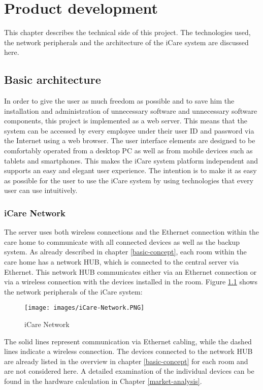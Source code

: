 \chapter{Product development}
This chapter describes the technical side of this project. The technologies used, the network peripherals and the architecture of the iCare system are discussed here.
\section{Basic architecture}
In order to give the user as much freedom as possible and to save him the installation and administration of unnecessary software and unnecessary software components, this project is implemented as a web server. This means that the system can be accessed by every employee under their user ID and password via the Internet using a web browser. The user interface elements are designed to be comfortably operated from a desktop PC as well as from mobile devices such as tablets and smartphones. This makes the iCare system platform independent and supports an easy and elegant user experience. The intention is to make it as easy as possible for the user to use the iCare system by using technologies that every user can use intuitively.

\subsection{iCare Network}
The server uses both wireless connections and the Ethernet connection within the care home to communicate with all connected devices as well as the backup system. As already described in chapter \ref{basic-concept}, each room within the care home has a network HUB, which is connected to the central server via Ethernet. This network HUB communicates either via an Ethernet connection or via a wireless connection with the devices installed in the room. Figure \ref{icare-network} shows the network peripherals of the iCare system:
\begin{figure}[H]
	\centering
	\texttt{[image: images/iCare-Network.PNG]}
	\caption{iCare Network}
	\label{icare-network}
\end{figure}
The solid lines represent communication via Ethernet cabling, while the dashed lines indicate a wireless connection. The devices connected to the network HUB are already listed in the overview in chapter \ref{basic-concept} for each room and are not considered here. A detailed examination of the individual devices can be found in the hardware calculation in Chapter \ref{market-analysis}.

